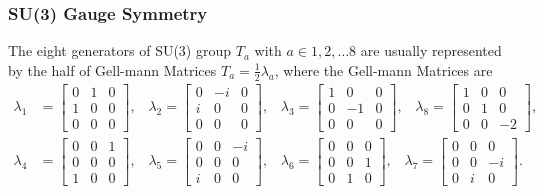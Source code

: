 \subsubsection{SU(3) Gauge Symmetry}
The eight generators of SU(3) group $T_a$ with $a \in {1,2,\dots 8}$ are usually represented by the half of Gell-mann Matrices $T_a = \frac{1}{2} \lambda_a$, where the Gell-mann Matrices are 
%
\begin{equation}
\begin{split}
    \lambda_1 &= \begin{bmatrix} 0 & 1 & 0 \\ 1 & 0 & 0 \\ 0 & 0 & 0\end{bmatrix}, \;\;\; 
    \lambda_2 = \begin{bmatrix} 0 &-i & 0 \\ i & 0 & 0 \\ 0 & 0 & 0\end{bmatrix}, \;\;\; 
    \lambda_3 = \begin{bmatrix} 1 & 0 & 0 \\ 0 &-1 & 0 \\ 0 & 0 & 0\end{bmatrix}, \;\;\; 
    \lambda_8 = \begin{bmatrix} 1 & 0 & 0 \\ 0 & 1 & 0 \\ 0 & 0 &-2\end{bmatrix}, \\
    \lambda_4 &= \begin{bmatrix} 0 & 0 & 1 \\ 0 & 0 & 0 \\ 1 & 0 & 0\end{bmatrix}, \;\;\; 
    \lambda_5 = \begin{bmatrix} 0 & 0 &-i \\ 0 & 0 & 0 \\ i & 0 & 0\end{bmatrix}, \;\;\; 
    \lambda_6 = \begin{bmatrix} 0 & 0 & 0 \\ 0 & 0 & 1 \\ 0 & 1 & 0\end{bmatrix}, \;\;\; 
    \lambda_7 = \begin{bmatrix} 0 & 0 & 0 \\ 0 & 0 &-i \\ 0 & i & 0\end{bmatrix}.
\end{split}
\end{equation}

